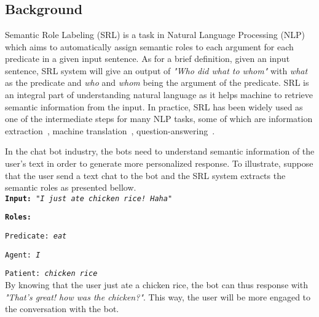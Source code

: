 \chapter{\babSatu}


\section{Background}
	
Semantic Role Labeling (SRL) is a task in Natural Language Processing (NLP) which aims to automatically assign semantic roles to each argument for each predicate in a given input sentence. As for a brief definition, given an input sentence, SRL system will give an output of \textit{"Who did what to whom"} with \textit{what} as the predicate and \textit{who} and \textit{whom} being the argument of the predicate. SRL is an integral part of understanding natural language as it helps machine to retrieve semantic information from the input. In practice, SRL has been widely used as one of the intermediate steps for many NLP tasks, some of which are information extraction~\citep{emanuele2013textual, surdeanu2003using}, machine translation~\citep{liu2010semantic, lo2013improving}, question-answering~\citep{shen2007using, moschitti2003open}.

In the chat bot industry, the bots need to understand semantic information of the user's text in order to generate more personalized response. To illustrate, suppose that the user send a text chat to the bot and the SRL system extracts the semantic roles as presented bellow.
\\

\texttt{\textbf{Input:} 
\textit{"I just ate chicken rice! Haha"}}

\texttt{\textbf{Roles:}}

\texttt{Predicate: \textit{eat}}

\texttt{Agent: \textit{I}}

\texttt{Patient: \textit{chicken rice}}
\\

By knowing that the user just ate a chicken rice, the bot can thus response with \textit{"That's great! how was the chicken?"}. This way, the user will be more engaged to the conversation with the bot.


